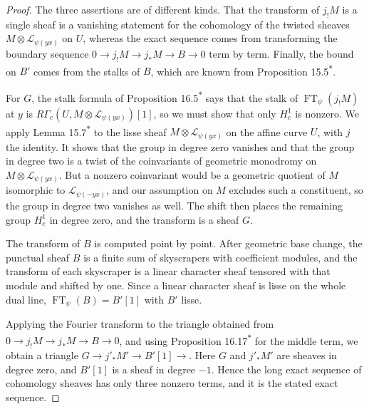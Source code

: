 \documentclass[11pt]{article}
\newcommand{\bpout}[1]{#1\textsuperscript{\hyperlink{bp-outside}{\ensuremath{\ast}}}}
\begin{document}
\begin{proof}[{Proof}]\label{bp6}%
The three assertions are of different kinds. That the transform of \(j_!M\) is a single sheaf is a vanishing statement for the cohomology of the twisted sheaves \(M\otimes\mathcal L_{\psi(yx)}\) on \(U\), whereas the exact sequence comes from transforming the boundary sequence \(0\to j_!M\to j_*M\to B\to0\) term by term. Finally, the bound on \(B'\) comes from the stalks of \(B\), which are known from Proposition \bpout{15.5}.

For \(G\), the stalk formula of Proposition \bpout{16.5} says that the stalk of \(\operatorname{FT}_\psi(j_!M)\) at \(y\) is \(R\Gamma_c(U,M\otimes\mathcal L_{\psi(yx)})[1]\), so we must show that only \(H^1_c\) is nonzero. We apply Lemma \bpout{15.7} to the lisse sheaf \(M\otimes\mathcal L_{\psi(yx)}\) on the affine curve \(U\), with \(j\) the identity. It shows that the group in degree zero vanishes and that the group in degree two is a twist of the coinvariants of geometric monodromy on \(M\otimes\mathcal L_{\psi(yx)}\). But a nonzero coinvariant would be a geometric quotient of \(M\) isomorphic to \(\mathcal L_{\psi(-yx)}\), and our assumption on \(M\) excludes such a constituent, so the group in degree two vanishes as well. The shift then places the remaining group \(H^1_c\) in degree zero, and the transform is a sheaf \(G\).

The transform of \(B\) is computed point by point. After geometric base change, the punctual sheaf \(B\) is a finite sum of skyscrapers with coefficient modules, and the transform of each skyscraper is a linear character sheaf tensored with that module and shifted by one. Since a linear character sheaf is lisse on the whole dual line, \(\operatorname{FT}_\psi(B)=B'[1]\) with \(B'\) lisse.

Applying the Fourier transform to the triangle obtained from \(0\to j_!M\to j_*M\to B\to0\), and using Proposition \bpout{16.17} for the middle term, we obtain a triangle \(G\to j'_*M'\to B'[1]\to\). Here \(G\) and \(j'_*M'\) are sheaves in degree zero, and \(B'[1]\) is a sheaf in degree \(-1\). Hence the long exact sequence of cohomology sheaves has only three nonzero terms, and it is the stated exact sequence.


\end{proof}
\end{document}
